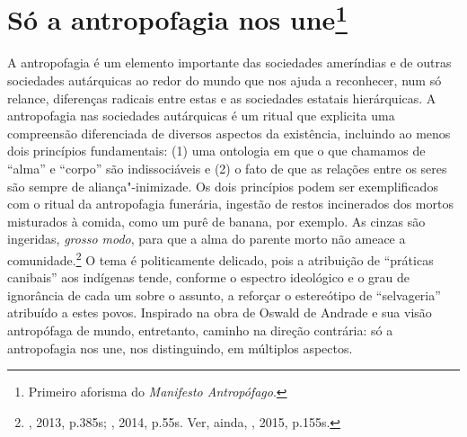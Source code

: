 \section{Só a antropofagia nos une\footnote{Primeiro aforisma do
  \emph{Manifesto Antropófago}.}}

A antropofagia é um elemento importante das sociedades ameríndias e de
outras sociedades autárquicas ao redor do mundo que nos ajuda a
reconhecer, num só relance, diferenças radicais entre estas e as
sociedades estatais hierárquicas. A antropofagia nas sociedades
autárquicas é um ritual que explicita uma compreensão diferenciada de
diversos aspectos da existência, incluindo ao menos dois princípios
fundamentais: (1) uma ontologia em que o que chamamos de ``alma'' e
``corpo'' são indissociáveis e (2) o fato de que as relações entre os
seres são sempre de aliança"-inimizade. Os dois princípios podem ser
exemplificados com o ritual da antropofagia funerária, ingestão de
restos incinerados dos mortos misturados à comida, como um purê de
banana, por exemplo. As cinzas são ingeridas, \emph{grosso modo}, para
que a alma do parente morto não ameace a comunidade.\footnote{,
  2013, p.385s; , 2014, p.55s. Ver, ainda, ,
  2015, p.155s.} O tema é politicamente delicado, pois a atribuição de
``práticas canibais'' aos indígenas tende, conforme o espectro
ideológico e o grau de ignorância de cada um sobre o assunto, a reforçar
o estereótipo de ``selvageria'' atribuído a estes povos. Inspirado na
obra de Oswald de Andrade e sua visão antropófaga de mundo, entretanto,
caminho na direção contrária: só a antropofagia nos une, nos
distinguindo, em múltiplos aspectos.

